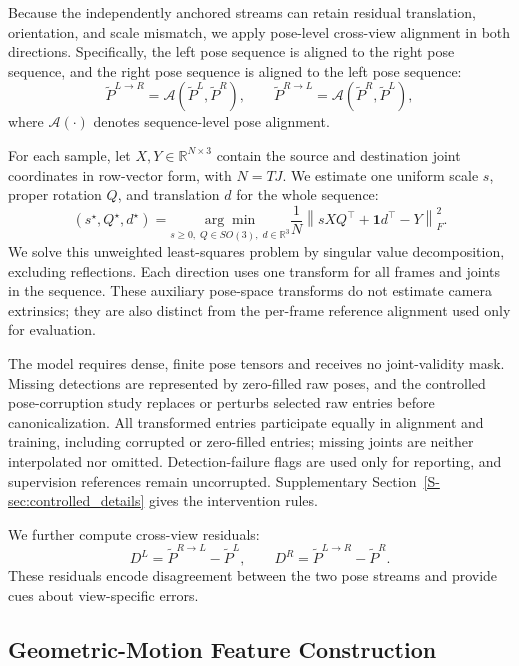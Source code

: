 \documentclass[preprint,12pt]{elsarticle}
\begin{document}
Because the independently anchored streams can retain residual translation, orientation, and scale mismatch, we apply pose-level cross-view alignment in both directions. Specifically, the left pose sequence is aligned to the right pose sequence, and the right pose sequence is aligned to the left pose sequence:
\[
\tilde{P}^{L \rightarrow R} = \mathcal{A}(\tilde{P}^{L}, \tilde{P}^{R}),
\qquad
\tilde{P}^{R \rightarrow L} = \mathcal{A}(\tilde{P}^{R}, \tilde{P}^{L}),
\]
where \(\mathcal{A}(\cdot)\) denotes sequence-level pose alignment.

For each sample, let \(X,Y\in\mathbb{R}^{N\times3}\) contain the source and destination joint coordinates in row-vector form, with \(N=TJ\). We estimate one uniform scale \(s\), proper rotation \(Q\), and translation \(d\) for the whole sequence:
\[
(s^\star,Q^\star,d^\star)=
\underset{s\geq0,\;Q\in SO(3),\;d\in\mathbb{R}^{3}}{\arg\min}
\frac{1}{N}\left\|sXQ^\top+\mathbf{1}d^\top-Y\right\|_F^2.
\]
We solve this unweighted least-squares problem by singular value decomposition, excluding reflections. Each direction uses one transform for all frames and joints in the sequence. These auxiliary pose-space transforms do not estimate camera extrinsics; they are also distinct from the per-frame reference alignment used only for evaluation.

The model requires dense, finite pose tensors and receives no joint-validity mask. Missing detections are represented by zero-filled raw poses, and the controlled pose-corruption study replaces or perturbs selected raw entries before canonicalization. All transformed entries participate equally in alignment and training, including corrupted or zero-filled entries; missing joints are neither interpolated nor omitted. Detection-failure flags are used only for reporting, and supervision references remain uncorrupted. Supplementary Section~\ref{S-sec:controlled_details} gives the intervention rules.

We further compute cross-view residuals:
\[
D^{L} = \tilde{P}^{R \rightarrow L} - \tilde{P}^{L},
\qquad
D^{R} = \tilde{P}^{L \rightarrow R} - \tilde{P}^{R}.
\]
These residuals encode disagreement between the two pose streams and provide cues about view-specific errors.

\subsection{Geometric-Motion Feature Construction}
\label{subsec:feature_construction}
\end{document}
